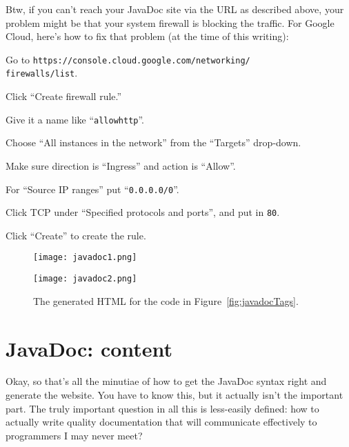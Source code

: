 
Btw, if you can't reach your JavaDoc site via the URL as described above, your
problem might be that your system firewall is blocking the traffic. For Google
Cloud, here's how to fix that problem (at the time of this writing):

\begin{compactenum}

\item Go to \texttt{https://console.cloud.google.com/networking/}\\\texttt{firewalls/list}.
\item Click ``Create firewall rule.''
\item Give it a name like ``\texttt{allowhttp}''.
\item Choose ``All instances in the network'' from the ``Targets'' drop-down.
\item Make sure direction is ``Ingress'' and action is ``Allow''.
\item For ``Source IP ranges'' put ``\texttt{0.0.0.0/0}''.
\item Click TCP under ``Specified protocols and ports'', and put in \texttt{80}.
\item Click ``Create'' to create the rule.
\end{compactenum}



\begin{figure}
\centering
\texttt{[image: javadoc1.png]}

\vspace{.2in}

\texttt{[image: javadoc2.png]}

\vspace{.2in}

\caption{The generated HTML for the code in Figure~\ref{fig:javadocTags}.}
\label{fig:javadocApi}
\end{figure}


\section{JavaDoc: content}

Okay, so that's all the minutiae of how to get the JavaDoc syntax right and
generate the website. You have to know this, but it actually isn't the
important part. The truly important question in all this is less-easily
defined: how to actually write quality documentation that will communicate
effectively to programmers I may never meet?

